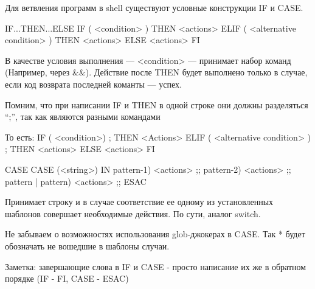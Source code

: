 Для ветвления программ в shell существуют условные конструкции IF и CASE.

\begin{shCode}{IF...THEN...ELSE}
	IF ( <condition> ) 
		THEN <actions>
	ELIF ( <alternative condition> ) 
		THEN <actions>
	ELSE 
		<actions>
	FI
\end{shCode}

В качестве условия выполнения --- <condition> --- принимает набор команд (Например, через  \&\&). Действие после THEN будет выполнено только в случае, если код возврата последней команты --- успех.

\begin{important}
	Помним, что при написании IF и THEN в одной строке они должны разделяться “;”, так как являются разными командами
\end{important}

\begin{shCode}{То есть:}
	IF ( <condition>) ; THEN <Actions>
	ELIF ( <alternative condition> ) ; THEN <actions>
	ELSE <actions>
	FI
\end{shCode}


\begin{shCode}{CASE}
	CASE (<string>) IN
     pattern-1)      
		<actions>
          	;;
     pattern-2)      
     	<actions>
          	;;
     pattern | pattern)
     	<actions>
          	;;
	ESAC
\end{shCode}

Принимает строку и в случае соответствие ее одному из установленных шаблонов совершает необходимые действия. По сути, аналог switch.

\begin{important}
	Не забываем о возможностях использования glob-джокерах в CASE. Так * будет обозначать не вошедшие в шаблоны случаи.
\end{important}

Заметка: завершающие слова в IF и CASE - просто написание их же в обратном порядке (IF - FI, CASE - ESAC)

